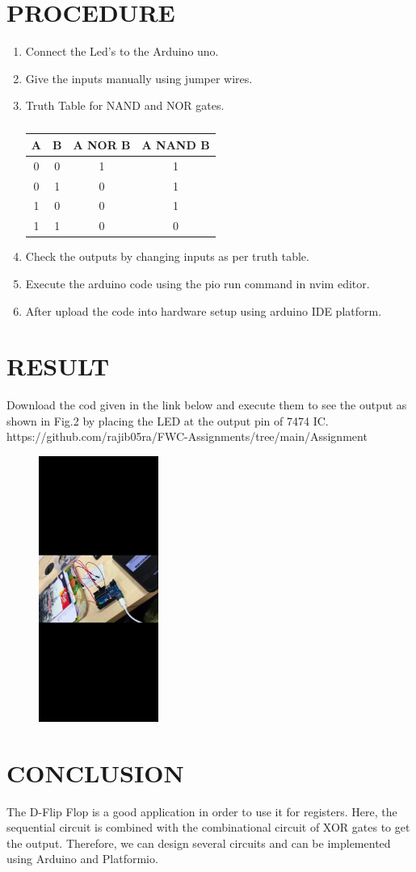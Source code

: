 \documentclass[conference]{IEEEtran}
\begin{document}
\section{PROCEDURE}
\begin{enumerate}
	 \item Connect the Led's to the Arduino uno.
	 \item Give the inputs manually using jumper wires.
	 \item Truth Table for NAND and NOR gates.
		 \begin{table}[htbp]
			 \centering
			 \begin{tabular}{|c|c|c|c|}
				 \hline
				 A & B & A NOR B & A NAND B \\
				 \hline
				 0 & 0 & 1 & 1 \\
				 \hline
				 0 & 1 & 0 & 1 \\
				 \hline
				 1 & 0 & 0 & 1 \\
				 \hline
				 1 & 1 & 0 & 0 \\
				 \hline
			 \end{tabular}
			 \vspace{0.1cm}
			 \caption{\label{tab:widgets}}
		 \end{table}
	 \item Check the outputs by changing inputs as per truth table.
	 \item Execute the arduino code using the pio run command in nvim editor.
	 \item After upload the code into hardware setup using arduino IDE platform.
 \end{enumerate}
 \section{RESULT}
 Download the cod given in the link below and execute them to see the output as shown in Fig.2 by placing the LED at the output pin of 7474 IC. 
https://github.com/rajib05ra/FWC-Assignments/tree/main/Assignment%
\begin{figure}[h] 
	\centering 
	\includegraphics[width=0.35\textwidth]{Fig3}
	\caption{\label{fig:Gates}}    
\end{figure}
\section{CONCLUSION}
The D-Flip Flop is a good application in order to use it for registers. Here, the sequential circuit is combined with the combinational circuit of XOR gates to get the output. Therefore, we can design several circuits and can be implemented using Arduino and Platformio.
\end{document}
